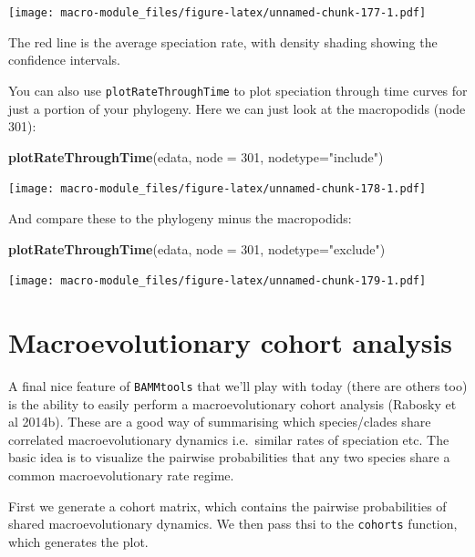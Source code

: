 \documentclass[]{book}
\newenvironment{Shaded}{\begin{snugshade}}{\end{snugshade}}
\newcommand{\KeywordTok}[1]{\textcolor[rgb]{0.13,0.29,0.53}{\textbf{{#1}}}}
\newcommand{\DataTypeTok}[1]{\textcolor[rgb]{0.13,0.29,0.53}{{#1}}}
\newcommand{\DecValTok}[1]{\textcolor[rgb]{0.00,0.00,0.81}{{#1}}}
\newcommand{\StringTok}[1]{\textcolor[rgb]{0.31,0.60,0.02}{{#1}}}
\newcommand{\NormalTok}[1]{{#1}}
\begin{document}
\texttt{[image: macro-module\_files/figure-latex/unnamed-chunk-177-1.pdf]}

The red line is the average speciation rate, with density shading
showing the confidence intervals.

You can also use \texttt{plotRateThroughTime} to plot speciation through
time curves for just a portion of your phylogeny. Here we can just look
at the macropodids (node 301):

\begin{Shaded}
\begin{Highlighting}[]
\KeywordTok{plotRateThroughTime}\NormalTok{(edata, }\DataTypeTok{node =} \DecValTok{301}\NormalTok{, }\DataTypeTok{nodetype=}\StringTok{"include"}\NormalTok{)}
\end{Highlighting}
\end{Shaded}

\texttt{[image: macro-module\_files/figure-latex/unnamed-chunk-178-1.pdf]}

And compare these to the phylogeny minus the macropodids:

\begin{Shaded}
\begin{Highlighting}[]
\KeywordTok{plotRateThroughTime}\NormalTok{(edata, }\DataTypeTok{node =} \DecValTok{301}\NormalTok{, }\DataTypeTok{nodetype=}\StringTok{"exclude"}\NormalTok{)}
\end{Highlighting}
\end{Shaded}

\texttt{[image: macro-module\_files/figure-latex/unnamed-chunk-179-1.pdf]}

\section{Macroevolutionary cohort
analysis}\label{macroevolutionary-cohort-analysis}

A final nice feature of \texttt{BAMMtools} that we'll play with today
(there are others too) is the ability to easily perform a
macroevolutionary cohort analysis (Rabosky et al 2014b). These are a
good way of summarising which species/clades share correlated
macroevolutionary dynamics i.e.~similar rates of speciation etc. The
basic idea is to visualize the pairwise probabilities that any two
species share a common macroevolutionary rate regime.

First we generate a cohort matrix, which contains the pairwise
probabilities of shared macroevolutionary dynamics. We then pass thsi to
the \texttt{cohorts} function, which generates the plot.
\end{document}
